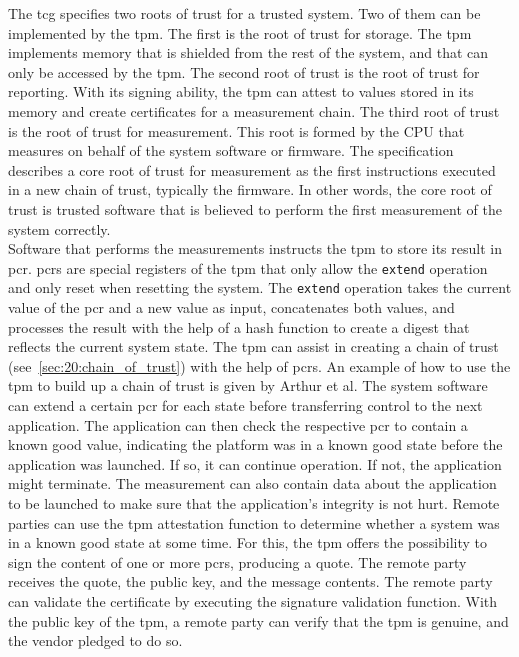 The \gls{tcg} specifies two roots of trust for a trusted system. Two of them can
be implemented by the \gls{tpm}. The first is the root of trust for storage. The
\gls{tpm} implements memory that is shielded from the rest of the system, and
that can only be accessed by the \gls{tpm}. The second root of trust is the root
of trust for reporting. With its signing ability, the \gls{tpm} can attest to
values stored in its memory and create certificates for a measurement chain. The
third root of trust is the root of trust for measurement. This root is formed by
the CPU that measures on behalf of the system software or firmware. The
specification describes a core root of trust for measurement as the first
instructions executed in a new chain of trust, typically the firmware. In other
words, the core root of trust is trusted software that is believed to perform
the first measurement of the system correctly.\\

Software that performs the measurements instructs the \gls{tpm} to store its
result in \gls{pcr}. \glspl{pcr} are special registers of the \gls{tpm} that
only allow the \texttt{extend} operation and only reset when resetting the
system. The \texttt{extend} operation takes the current value of the \gls{pcr}
and a new value as input, concatenates both values, and processes the result
with the help of a hash function to create a digest that reflects the current
system state. The \gls{tpm} can assist in creating a chain of trust
(see~\ref{sec:20:chain_of_trust}) with the help of \glspl{pcr}. An example of
how to use the \gls{tpm} to build up a chain of trust is given by Arthur et
al.\cite{arthur2015practical} The system software can extend a certain \gls{pcr}
for each state before transferring control to the next application. The
application can then check the respective \gls{pcr} to contain a known good
value, indicating the platform was in a known good state before the application
was launched. If so, it can continue operation. If not, the application might
terminate. The measurement can also contain data about the application to be
launched to make sure that the application's integrity is not hurt. Remote
parties can use the \gls{tpm} attestation function to determine whether a system
was in a known good state at some time. For this, the \gls{tpm} offers the
possibility to sign the content of one or more \glspl{pcr}, producing a quote.
The remote party receives the quote, the public key, and the message contents.
The remote party can validate the certificate by executing the signature
validation function. With the public key of the \gls{tpm}, a remote party can
verify that the \gls{tpm} is genuine, and the vendor pledged to do so.
